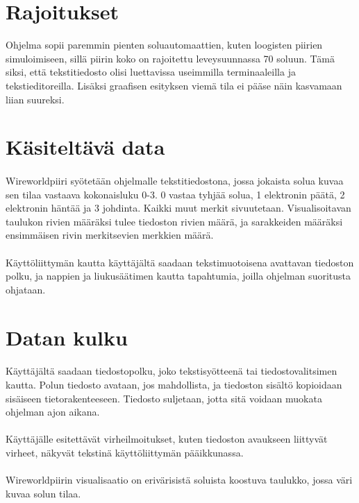 \documentclass[a4paper,12pt]{article}
\begin{document}
\section{Rajoitukset}
Ohjelma sopii paremmin pienten soluautomaattien, kuten
loogisten piirien simuloimiseen, sillä piirin koko on rajoitettu
leveysuunnassa 70 soluun. Tämä siksi, että tekstitiedosto olisi
luettavissa useimmilla terminaaleilla ja tekstieditoreilla. Lisäksi
graafisen esityksen viemä tila ei pääse näin kasvamaan liian suureksi.

\section{Käsiteltävä data}
\paragraph{}
Wireworldpiiri syötetään ohjelmalle tekstitiedostona, jossa jokaista
solua kuvaa sen tilaa vastaava kokonaisluku 0-3. 0 vastaa tyhjää solua,
1 elektronin päätä, 2 elektronin häntää ja 3 johdinta. Kaikki muut
merkit sivuutetaan. Visualisoitavan taulukon rivien määräksi tulee
tiedoston rivien määrä, ja sarakkeiden määräksi ensimmäisen rivin
merkitsevien merkkien määrä.
\paragraph{}
Käyttöliittymän kautta käyttäjältä saadaan tekstimuotoisena avattavan
tiedoston polku, ja nappien ja liukusäätimen kautta tapahtumia, joilla
ohjelman suoritusta ohjataan.

\section{Datan kulku}
\paragraph{}
Käyttäjältä saadaan tiedostopolku, joko tekstisyötteenä tai
tiedostovalitsimen kautta. Polun tiedosto avataan, jos mahdollista, ja
tiedoston sisältö kopioidaan sisäiseen tietorakenteeseen. Tiedosto
suljetaan, jotta sitä voidaan muokata ohjelman ajon aikana.
\paragraph{}
Käyttäjälle esitettävät virheilmoitukset, kuten tiedoston avaukseen
liittyvät virheet, näkyvät tekstinä käyttöliittymän pääikkunassa.
\paragraph{}
Wireworldpiirin visualisaatio on erivärisistä soluista koostuva
taulukko, jossa väri kuvaa solun tilaa.
\newpage
\end{document}
